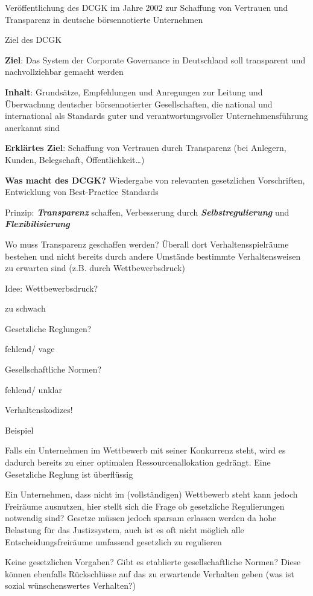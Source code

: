\documentclass[
]{article}
\begin{document}
Veröffentlichung des DCGK im Jahre 2002 zur Schaffung von Vertrauen und
Transparenz in deutsche börsennotierte Unternehmen

Ziel des DCGK

\textbf{Ziel}: Das System der Corporate Governance in Deutschland soll
transparent und nachvollziehbar gemacht werden

\textbf{Inhalt}: Grundsätze, Empfehlungen und Anregungen zur Leitung und
Überwachung deutscher börsennotierter Gesellschaften, die national und
international als Standards guter und verantwortungsvoller
Unternehmensführung anerkannt sind

\textbf{Erklärtes Ziel}: Schaffung von Vertrauen durch Transparenz (bei
Anlegern, Kunden, Belegschaft, Öffentlichkeit\ldots)

\textbf{Was macht des DCGK?} Wiedergabe von relevanten gesetzlichen
Vorschriften, Entwicklung von Best-Practice Standards

Prinzip: \textbf{\emph{Transparenz}} schaffen, Verbesserung durch
\textbf{\emph{Selbstregulierung}} und \textbf{\emph{Flexibilisierung}}

Wo muss Transparenz geschaffen werden? Überall dort Verhaltensspielräume
bestehen und nicht bereits durch andere Umstände bestimmte
Verhaltensweisen zu erwarten sind (z.B. durch Wettbewerbsdruck)

Idee: Wettbewerbsdruck?

zu schwach

Gesetzliche Reglungen?

fehlend/ vage

Gesellschaftliche Normen?

fehlend/ unklar

Verhaltenskodizes!

Beispiel

Falls ein Unternehmen im Wettbewerb mit seiner Konkurrenz steht, wird es
dadurch bereits zu einer optimalen Ressourcenallokation gedrängt. Eine
Gesetzliche Reglung ist überflüssig

Ein Unternehmen, dass nicht im (vollständigen) Wettbewerb steht kann
jedoch Freiräume ausnutzen, hier stellt sich die Frage ob gesetzliche
Regulierungen notwendig sind? Gesetze müssen jedoch sparsam erlassen
werden da hohe Belastung für das Justizsystem, auch ist es oft nicht
möglich alle Entscheidungsfreiräume umfassend gesetzlich zu regulieren

Keine gesetzlichen Vorgaben? Gibt es etablierte gesellschaftliche
Normen? Diese können ebenfalls Rückschlüsse auf das zu erwartende
Verhalten geben (was ist sozial wünschenswertes Verhalten?)
\end{document}
